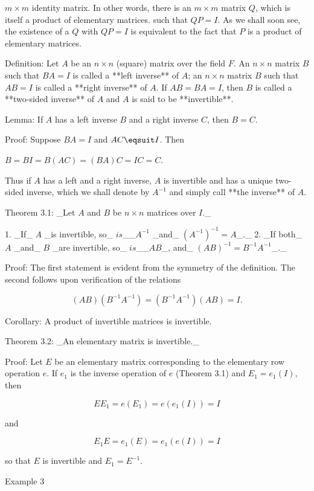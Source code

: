 \(m\times m\) identity matrix. In other words, there is an \(m\times m\) matrix \(Q\), which is itself a product of elementary matrices. such that \(QP=I\). As we shall soon see, the existence of a \(Q\) with \(QP=I\) is equivalent to the fact that \(P\) is a product of elementary matrices.

Definition: Let \(A\) be an \(n\times n\) (square) matrix over the field \(F\). An \(n\times n\) matrix \(B\) such that \(BA=I\) is called a **left inverse** of \(A\); an \(n\times n\) matrix \(B\) such that \(AB=I\) is called a **right inverse** of \(A\). If \(AB=BA=I\), then \(B\) is called a **two-sided inverse** of \(A\) and \(A\) is said to be **invertible**.

Lemma: If \(A\) has a left inverse \(B\) and a right inverse \(C\), then \(B=C\).

Proof: Suppose \(BA=I\) and \(AC\eqsuit I\). Then

\(B=BI=B(AC)=(BA)C=IC=C\).

Thus if \(A\) has a left and a right inverse, \(A\) is invertible and has a unique two-sided inverse, which we shall denote by \(A^{-1}\) and simply call **the inverse** of \(A\).

Theorem 3.1: _Let \(A\) and \(B\) be \(n\times n\) matrices over \(I\)._

1. _If_ \(A\) _is invertible, so_ \(is\)__\(A^{-1}\) _and_ \((A^{-1})^{-1}=A\)_._
2. _If both_ \(A\) _and_ \(B\) _are invertible, so_ \(is\)__\(AB\)_, and_ \((AB)^{-1}=B^{-1}A^{-1}\)_._

Proof: The first statement is evident from the symmetry of the definition. The second follows upon verification of the relations

\[(AB)(B^{-1}A^{-1})=(B^{-1}A^{-1})(AB)=I.\]

Corollary: A product of invertible matrices is invertible.

Theorem 3.2: _An elementary matrix is invertible._

Proof: Let \(E\) be an elementary matrix corresponding to the elementary row operation \(e\). If \(e_{1}\) is the inverse operation of \(e\) (Theorem 3.1) and \(E_{1}=e_{1}(I)\), then

\[EE_{1}=e(E_{1})=e(e_{1}(I))=I\]

and

\[E_{1}E=e_{1}(E)=e_{1}(e(I))=I\]

so that \(E\) is invertible and \(E_{1}=E^{-1}\).

Example 3 